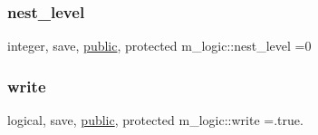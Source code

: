 \mbox{\label{namespacem__logic_aba076b8206140be84ad573bc89c82b14}} 
\subsubsection{\texorpdfstring{nest\+\_\+level}{nest\_level}}
{\footnotesize\ttfamily integer, save, \hyperlink{M__stopwatch_83_8txt_a2f74811300c361e53b430611a7d1769f}{public}, protected m\+\_\+logic\+::nest\+\_\+level =0}

\mbox{\label{namespacem__logic_a487df89eac953b22a40b143aaf8ff1ea}} 
\subsubsection{\texorpdfstring{write}{write}}
{\footnotesize\ttfamily logical, save, \hyperlink{M__stopwatch_83_8txt_a2f74811300c361e53b430611a7d1769f}{public}, protected m\+\_\+logic\+::write =.true.}

